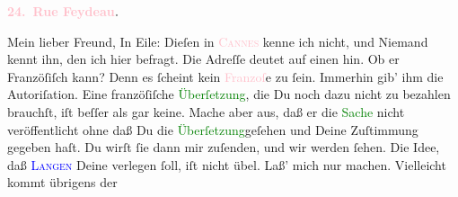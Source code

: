            \pstart
           \begin{otherlanguage}{french}\textcolor{gray}{\textbf{\textbf{\textcolor{pink}{24. Rue Feydeau}{}\ledrightnote{\textcolor{pink}{rue Feydeau}}.}}}\end{otherlanguage}\pend
           \pstart\center{}Mein lieber Freund,\pend\pstart
           In Eile: Dieſen \label{K_L02733-1v}\label{K_L02733-1h} in \textsc{\textcolor{pink}{Cannes}{}\ledrightnote{\textcolor{pink}{Cannes}}} kenne ich nicht, und Niemand kennt ihn, den ich hier befragt. Die Adreſſe
               deutet auf einen \label{K_L02733-2v}\label{K_L02733-2h}
               hin. Ob er Franzöſiſch kann? Denn es ſcheint kein \textcolor{pink}{Franzoſ}{}e zu ſein. Immerhin gib’ ihm die Autoriſation. Eine
               franzöſiſche \textcolor{green}{Überſetzung}{}, die
               Du noch dazu nicht zu bezahlen brauchſt, iſt beſſer als gar keine. Mache aber aus,
               daß er die \textcolor{green}{Sache}{} nicht
               veröffentlicht ohne daß Du die \textcolor{green}{Überſetzung}{}geſehen und Deine Zuſtimmung gegeben haſt. Du wirſt
               ſie dann mir zuſenden, und wir werden ſehen.\pend
           \pstart
           Die Idee, daß \textsc{\textcolor{brown}{\textcolor{blue}{Langen}{}\ledrightnote{\textcolor{blue}{Albert Langen}}}{}\ledrightnote{\textcolor{brown}{Albert Langen}}} Deine \label{K_L02733-3v}\label{K_L02733-3h}
               verlegen ſoll, iſt nicht übel. Laß’ mich nur machen. Vielleicht kommt übrigens der
